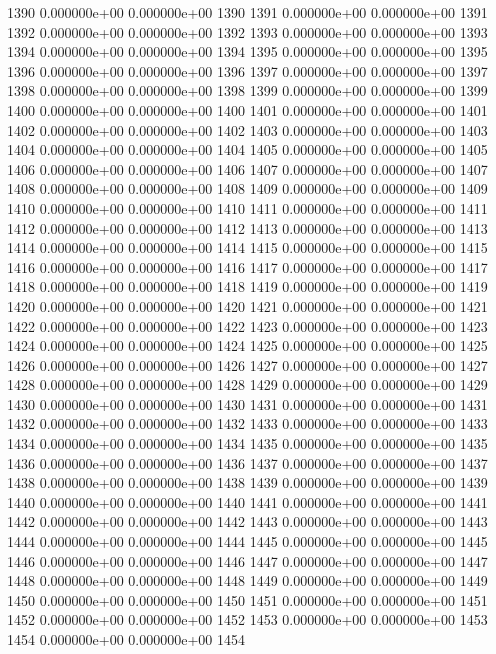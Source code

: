 \documentclass{article}
\begin{document}
\begin{Schunk}
\begin{Soutput}
1390   0.000000e+00   0.000000e+00 1390
1391   0.000000e+00   0.000000e+00 1391
1392   0.000000e+00   0.000000e+00 1392
1393   0.000000e+00   0.000000e+00 1393
1394   0.000000e+00   0.000000e+00 1394
1395   0.000000e+00   0.000000e+00 1395
1396   0.000000e+00   0.000000e+00 1396
1397   0.000000e+00   0.000000e+00 1397
1398   0.000000e+00   0.000000e+00 1398
1399   0.000000e+00   0.000000e+00 1399
1400   0.000000e+00   0.000000e+00 1400
1401   0.000000e+00   0.000000e+00 1401
1402   0.000000e+00   0.000000e+00 1402
1403   0.000000e+00   0.000000e+00 1403
1404   0.000000e+00   0.000000e+00 1404
1405   0.000000e+00   0.000000e+00 1405
1406   0.000000e+00   0.000000e+00 1406
1407   0.000000e+00   0.000000e+00 1407
1408   0.000000e+00   0.000000e+00 1408
1409   0.000000e+00   0.000000e+00 1409
1410   0.000000e+00   0.000000e+00 1410
1411   0.000000e+00   0.000000e+00 1411
1412   0.000000e+00   0.000000e+00 1412
1413   0.000000e+00   0.000000e+00 1413
1414   0.000000e+00   0.000000e+00 1414
1415   0.000000e+00   0.000000e+00 1415
1416   0.000000e+00   0.000000e+00 1416
1417   0.000000e+00   0.000000e+00 1417
1418   0.000000e+00   0.000000e+00 1418
1419   0.000000e+00   0.000000e+00 1419
1420   0.000000e+00   0.000000e+00 1420
1421   0.000000e+00   0.000000e+00 1421
1422   0.000000e+00   0.000000e+00 1422
1423   0.000000e+00   0.000000e+00 1423
1424   0.000000e+00   0.000000e+00 1424
1425   0.000000e+00   0.000000e+00 1425
1426   0.000000e+00   0.000000e+00 1426
1427   0.000000e+00   0.000000e+00 1427
1428   0.000000e+00   0.000000e+00 1428
1429   0.000000e+00   0.000000e+00 1429
1430   0.000000e+00   0.000000e+00 1430
1431   0.000000e+00   0.000000e+00 1431
1432   0.000000e+00   0.000000e+00 1432
1433   0.000000e+00   0.000000e+00 1433
1434   0.000000e+00   0.000000e+00 1434
1435   0.000000e+00   0.000000e+00 1435
1436   0.000000e+00   0.000000e+00 1436
1437   0.000000e+00   0.000000e+00 1437
1438   0.000000e+00   0.000000e+00 1438
1439   0.000000e+00   0.000000e+00 1439
1440   0.000000e+00   0.000000e+00 1440
1441   0.000000e+00   0.000000e+00 1441
1442   0.000000e+00   0.000000e+00 1442
1443   0.000000e+00   0.000000e+00 1443
1444   0.000000e+00   0.000000e+00 1444
1445   0.000000e+00   0.000000e+00 1445
1446   0.000000e+00   0.000000e+00 1446
1447   0.000000e+00   0.000000e+00 1447
1448   0.000000e+00   0.000000e+00 1448
1449   0.000000e+00   0.000000e+00 1449
1450   0.000000e+00   0.000000e+00 1450
1451   0.000000e+00   0.000000e+00 1451
1452   0.000000e+00   0.000000e+00 1452
1453   0.000000e+00   0.000000e+00 1453
1454   0.000000e+00   0.000000e+00 1454

\end{Soutput}
\end{Schunk}
\end{document}
